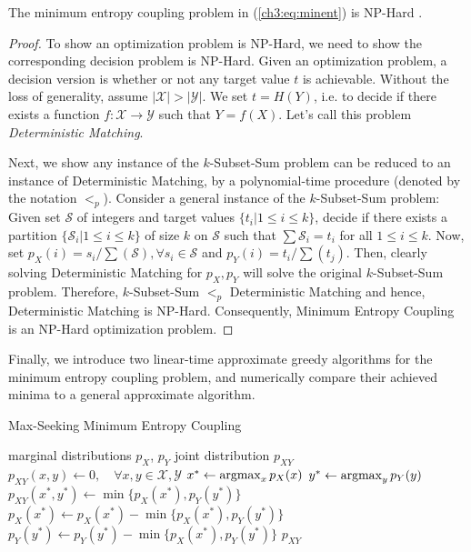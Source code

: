 \begin{remark} The minimum entropy coupling problem in (\ref{ch3:eq:minent}) is NP-Hard \cite{kovavcevic2015entropy}.
\end{remark}
\begin{proof}
To show an optimization problem is NP-Hard, we need to show the corresponding decision problem is NP-Hard.  Given an optimization problem, a decision version is whether or not any target value $t$ is achievable. Without the loss of generality, assume $|\mathcal{X}| > |\mathcal{Y}|$. We set $t=H(Y)$, i.e. to decide if there exists a function $f: \mathcal{X}\to\mathcal{Y}$ such that $Y=f(X)$. Let's call this problem \textit{Deterministic Matching}.

Next, we show any instance of the $k$-Subset-Sum problem can be reduced to an instance of Deterministic Matching, by a polynomial-time procedure (denoted by the notation $<_p$). Consider a general instance of the $k$-Subset-Sum problem: Given set $\mathcal{S}$ of integers and target values $\{t_i|1\leq i\leq k\}$, decide if there exists a partition $\{\mathcal{S}_i|1\leq i\leq k \}$ of size $k$ on $\mathcal{S}$ such that $\sum \mathcal{S}_i = t_i$ for all $1\leq i\leq k$. 
Now, set $p_X(i)=s_i/\sum(\mathcal{S}), \forall s_i \in \mathcal{S}$ and $p_Y(i)=t_i / \sum(t_j)$. Then, clearly solving Deterministic Matching for $p_X, p_Y$ will solve the original $k$-Subset-Sum problem. Therefore, $k$-Subset-Sum $<_p$ Deterministic Matching and hence, Deterministic Matching is NP-Hard. Consequently, Minimum Entropy Coupling is an NP-Hard optimization problem.
\end{proof}

Finally, we introduce two linear-time approximate greedy algorithms for the minimum entropy coupling problem, and numerically compare their achieved minima to a general approximate algorithm.

\vspace{0.5em}

\begin{algorithm}[H]
\caption{Max-Seeking Minimum Entropy Coupling}\label{ch3:alg:maxseekMEC}
\begin{algorithmic}[1]
    \Require marginal distributions $p_X$, $p_Y$
    \Ensure joint distribution $p_{XY}$
    \vspace{2pt}
    \State $p_{XY}(x, y) \gets 0, \quad \forall x, y \in \mathcal{X}, \mathcal{Y}$ 
        \State $x^* \gets \operatorname*{argmax}_{x} p_X(x)$ 
        \State $y^* \gets \operatorname*{argmax}_{y} p_Y(y)$ 
        \State $p_{XY}(x^*, y^*) \gets \min\{p_X(x^*), p_Y(y^*)\}$ 
        \State $p_X(x^*) \gets  p_X(x^*) - \min\{p_X(x^*), p_Y(y^*)\}$ 
        \State $p_Y(y^*) \gets  p_Y(y^*) - \min\{p_X(x^*), p_Y(y^*)\}$ 
    \EndWhile
    \State\Return $p_{XY}$
\end{algorithmic}
\end{algorithm}

